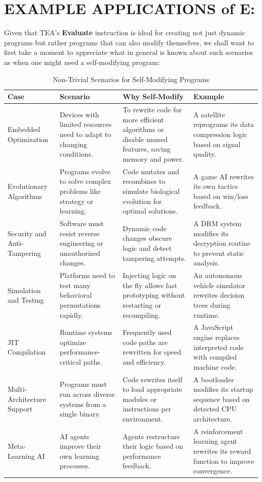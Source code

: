 \documentclass[a4paper, 18pt]{book} %
\renewcommand\arraystretch{1.3}
\begin{document}
\section{EXAMPLE APPLICATIONS of E:}
\label{SECEXAMPE}

  
Given that TEA's \textbf{Evaluate} instruction is ideal for creating not just dynamic programs but rather programs that can also modify themselves, we shall want to first take a moment to appreciate what in general is known\cite{copilot_assistant} about such scenarios as when one might need a self-modifying program:



\begin{table}[htbp]
\centering
\caption{Non-Trivial Scenarios for Self-Modifying Programs}
\renewcommand{\arraystretch}{1.4}
\begin{tabularx}{0.8\textwidth}{>{\raggedright\arraybackslash}p{2.5cm} >{\raggedright\arraybackslash}X >{\raggedright\arraybackslash}X >{\raggedright\arraybackslash}X}
\hline
\textbf{Case} & \textbf{Scenario} & \textbf{Why Self-Modify} & \textbf{Example} \\
\hline
Embedded Optimization & Devices with limited resources need to adapt to changing conditions. & To rewrite code for more efficient algorithms or disable unused features, saving memory and power. & A satellite reprograms its data compression logic based on signal quality. \\
\hline
Evolutionary Algorithms & Programs evolve to solve complex problems like strategy or learning. & Code mutates and recombines to simulate biological evolution for optimal solutions. & A game AI rewrites its own tactics based on win/loss feedback. \\
\hline
Security and Anti-Tampering & Software must resist reverse engineering or unauthorized changes. & Dynamic code changes obscure logic and detect tampering attempts. & A DRM system modifies its decryption routine to prevent static analysis. \\
\hline
Simulation and Testing & Platforms need to test many behavioral permutations rapidly. & Injecting logic on the fly allows fast prototyping without restarting or recompiling. & An autonomous vehicle simulator rewrites decision trees during runtime. \\
\hline
JIT Compilation & Runtime systems optimize performance-critical paths. & Frequently used code paths are rewritten for speed and efficiency. & A JavaScript engine replaces interpreted code with compiled machine code. \\
\hline
Multi-Architecture Support & Programs must run across diverse systems from a single binary. & Code rewrites itself to load appropriate modules or instructions per environment. & A bootloader modifies its startup sequence based on detected CPU architecture. \\
\hline
Meta-Learning AI & AI agents improve their own learning processes. & Agents restructure their logic based on performance feedback. & A reinforcement learning agent rewrites its reward function to improve convergence. \\
\hline
\end{tabularx}
\end{table}
\end{document}
